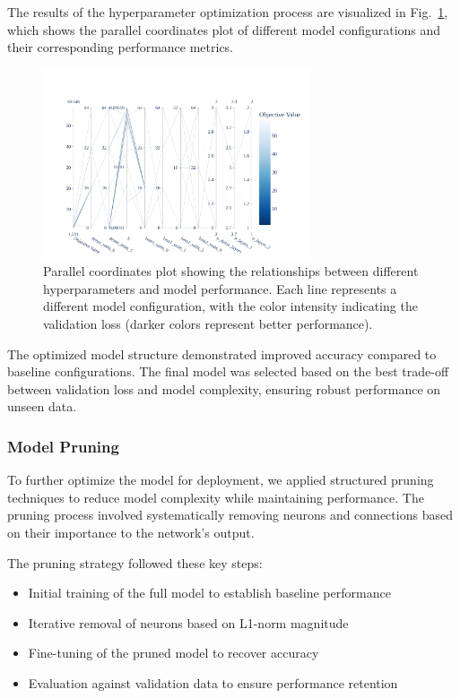 \documentclass[3p]{elsarticle}
\begin{document}
The results of the hyperparameter optimization process are visualized in Fig.~\ref{fig:parallel_plot}, which shows the parallel coordinates plot of different model configurations and their corresponding performance metrics.

\begin{figure}[H]
	\centering
	\includegraphics[width=0.7\textwidth]{../Figure/parallel_plot_full.pdf}
	\caption{Parallel coordinates plot showing the relationships between different hyperparameters and model performance. Each line represents a different model configuration, with the color intensity indicating the validation loss (darker colors represent better performance).}
	\label{fig:parallel_plot}
\end{figure}



The optimized model structure demonstrated improved accuracy compared to baseline configurations. The final model was selected based on the best trade-off between validation loss and model complexity, ensuring robust performance on unseen data.

\subsubsection{Model Pruning}
To further optimize the model for deployment, we applied structured pruning techniques to reduce model complexity while maintaining performance. The pruning process involved systematically removing neurons and connections based on their importance to the network's output.

The pruning strategy followed these key steps:
\begin{itemize}
    \item Initial training of the full model to establish baseline performance
    \item Iterative removal of neurons based on L1-norm magnitude
    \item Fine-tuning of the pruned model to recover accuracy
    \item Evaluation against validation data to ensure performance retention
\end{itemize}
\end{document}
